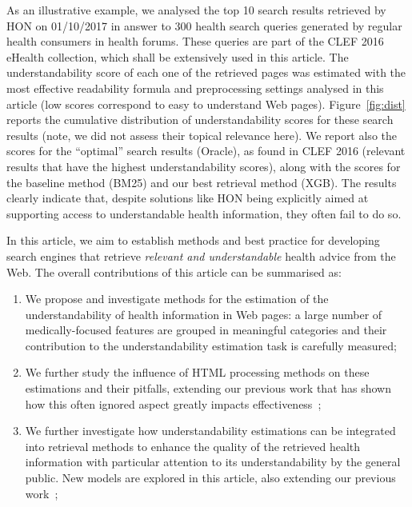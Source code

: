 As an illustrative example, we analysed the top 10 search results retrieved by HON on 01/10/2017 in answer to 300 health search queries generated by regular health consumers in health forums.
These queries are part of the CLEF 2016 eHealth collection, which shall be extensively used in this article. 
The understandability score of each one of the retrieved pages was estimated with the most effective readability formula and preprocessing settings analysed in this article (low scores correspond to easy to understand Web pages).
Figure~\ref{fig:dist} reports the cumulative distribution of understandability scores for these search results (note, we did not assess their topical relevance here). 
We report also the scores for the ``optimal'' search results (Oracle), as found in CLEF 2016 (relevant results that have the highest understandability scores), along with the scores for the baseline method (BM25) and our best retrieval method (XGB). 
The results clearly indicate that, despite solutions like HON being explicitly aimed at supporting access to understandable health information, they often fail to do so.


In this article, we aim to establish methods and best practice for developing search engines that retrieve \textit{relevant and understandable} health advice from the Web. The overall contributions of this article can be summarised as:
\begin{enumerate}
\item We propose and investigate methods for the estimation of the understandability of health information in Web pages: a large number of medically-focused features are grouped in meaningful categories and their contribution to the understandability estimation task is carefully measured;
\item We further study the influence of HTML processing methods on these estimations and their pitfalls, extending our previous work that has shown how this often ignored aspect greatly impacts effectiveness~\cite{palotti15};
\item We further investigate how understandability estimations can be integrated into retrieval methods to enhance the quality of the retrieved health information with particular attention to its understandability by the general public. New models are explored in this article, also extending our previous work~\cite{palotti2016ranking};
\end{enumerate}

